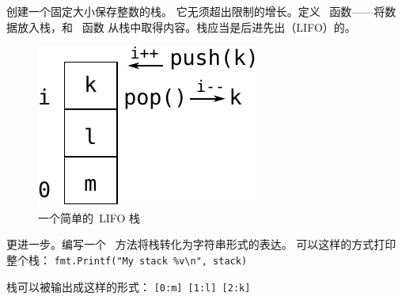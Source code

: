 \begin{Exercise}[title={栈},difficulty=1]
\label{ex:stack}
\Question \label{ex:stack q1} 创建一个固定大小保存整数的栈。
它无须超出限制的增长。定义~ 函数——将数据放入栈，和~ 函数
从栈中取得内容。栈应当是后进先出（LIFO）的。

\begin{figure}[H]
\caption{一个简单的~LIFO 栈}
\label{fig:stack}
\begin{center}
\includegraphics[scale=0.65]{fig/stack.pdf}
\end{center}
\end{figure}

\Question \label{ex:stack q2} 更进一步。编写一个~ 方法将栈转化为字符串形式的表达。
可以这样的方式打印整个栈：
\lstinline{fmt.Printf("My stack %v\n", stack)}

\noindent{}栈可以被输出成这样的形式：
\texttt{[0:m] [1:l] [2:k]}

\end{Exercise}


